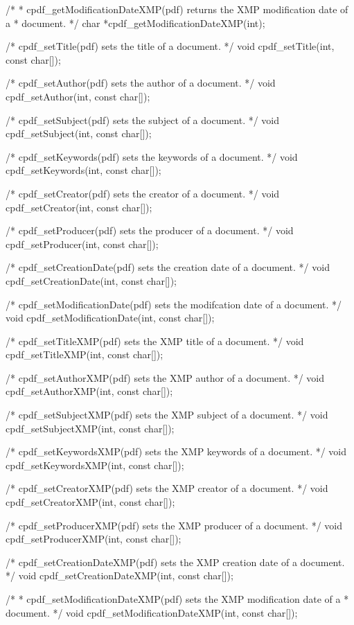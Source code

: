 /*
 * cpdf_getModificationDateXMP(pdf) returns the XMP modification date of a
 * document.
 */
char *cpdf_getModificationDateXMP(int);

/* cpdf_setTitle(pdf) sets the title of a document. */
void cpdf_setTitle(int, const char[]);

/* cpdf_setAuthor(pdf) sets the author of a document. */
void cpdf_setAuthor(int, const char[]);

/* cpdf_setSubject(pdf) sets the subject of a document. */
void cpdf_setSubject(int, const char[]);

/* cpdf_setKeywords(pdf) sets the keywords of a document. */
void cpdf_setKeywords(int, const char[]);

/* cpdf_setCreator(pdf) sets the creator of a document. */
void cpdf_setCreator(int, const char[]);

/* cpdf_setProducer(pdf) sets the producer of a document. */
void cpdf_setProducer(int, const char[]);

/* cpdf_setCreationDate(pdf) sets the creation date of a document. */
void cpdf_setCreationDate(int, const char[]);

/* cpdf_setModificationDate(pdf) sets the modifcation date of a document. */
void cpdf_setModificationDate(int, const char[]);

/* cpdf_setTitleXMP(pdf) sets the XMP title of a document. */
void cpdf_setTitleXMP(int, const char[]);

/* cpdf_setAuthorXMP(pdf) sets the XMP author of a document. */
void cpdf_setAuthorXMP(int, const char[]);

/* cpdf_setSubjectXMP(pdf) sets the XMP subject of a document. */
void cpdf_setSubjectXMP(int, const char[]);

/* cpdf_setKeywordsXMP(pdf) sets the XMP keywords of a document. */
void cpdf_setKeywordsXMP(int, const char[]);

/* cpdf_setCreatorXMP(pdf) sets the XMP creator of a document. */
void cpdf_setCreatorXMP(int, const char[]);

/* cpdf_setProducerXMP(pdf) sets the XMP producer of a document. */
void cpdf_setProducerXMP(int, const char[]);

/* cpdf_setCreationDateXMP(pdf) sets the XMP creation date of a document. */
void cpdf_setCreationDateXMP(int, const char[]);

/*
 * cpdf_setModificationDateXMP(pdf) sets the XMP modification date of a
 * document.
 */
void cpdf_setModificationDateXMP(int, const char[]);

